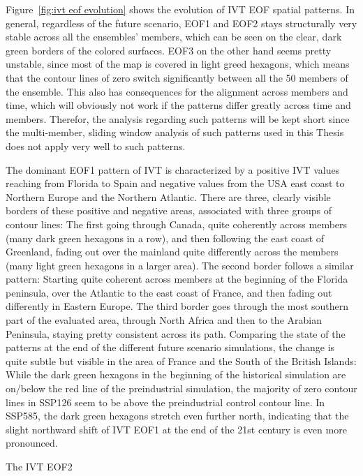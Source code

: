 Figure~\ref{fig:ivt eof evolution} shows the evolution of IVT EOF spatial patterns. 
In general, regardless of the future scenario, EOF1 and EOF2 stays structurally very stable across all the ensembles' members, which can be seen on the clear, dark green borders of the colored surfaces. 
EOF3 on the other hand seems pretty unstable, since most of the map is covered in light greed hexagons, which means that the contour lines of zero switch significantly between all the 50 members of the ensemble. 
This also has consequences for the alignment across members and time, which will obviously not work if the patterns differ greatly across time and members. 
Therefor, the analysis regarding such patterns will be kept short since the multi-member, sliding window analysis of such patterns used in this Thesis does not apply very well to such patterns. 

The dominant EOF1 pattern of IVT is characterized by a positive IVT values reaching from Florida to Spain and negative values from the USA east coast to Northern Europe and the Northern Atlantic. 
There are three, clearly visible borders of these positive and negative areas, associated with three groups of contour lines: The first going through Canada, quite coherently across members (many dark green hexagons in a row), and then following the east coast of Greenland, fading out over the mainland quite differently across the members (many light green hexagons in a larger area). 
The second border follows a similar pattern: Starting quite coherent across members at the beginning of the Florida peninsula, over the Atlantic to the east coast of France, and then fading out differently in Eastern Europe. 
The third border goes through the most southern part of the evaluated area, through North Africa and then to the Arabian Peninsula, staying pretty consistent across its path. 
Comparing the state of the patterns at the end of the different future scenario simulations, the change is quite subtle but visible in the area of France and the South of the British Islands:
While the dark green hexagons in the beginning of the historical simulation are on/below the red line of the preindustrial simulation, the majority of zero contour lines in SSP126 seem to be above the preindustrial control contour line. 
In SSP585, the dark green hexagons stretch even further north, indicating that the slight northward shift of IVT EOF1 at the end of the 21st century is even more pronounced. 

The IVT EOF2 




